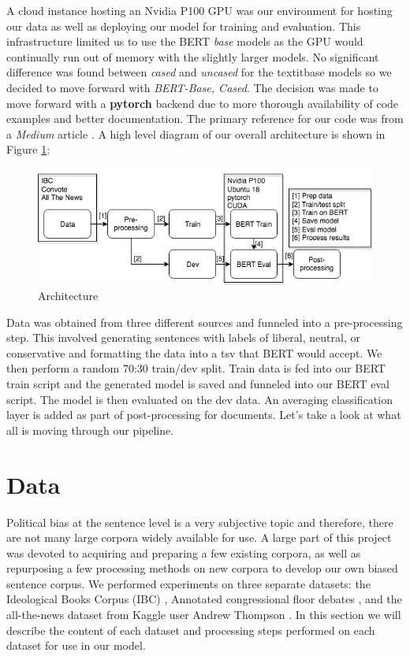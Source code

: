\documentclass[10pt,a4paper,onecolumn]{article}
\begin{document}
A cloud instance hosting an Nvidia P100 GPU was our environment for hosting our data as well as deploying our model for training and evaluation. This infrastructure limited us to use the BERT \textit{base} models as the GPU would continually run out of memory with the slightly larger models. No significant difference was found between \textit{cased} and \textit{uncased} for the textit{base} models so we decided to move forward with \textit{BERT-Base, Cased}. The decision was made to move forward with a \textbf{pytorch} backend due to more thorough availability of code examples and better documentation. The primary reference for our code was from a \textit{Medium} article \cite{usingbert}. A high level diagram of our overall architecture is shown in Figure \ref{fig:architecture}:
\begin{figure}[h]
	\begin{center}
		\includegraphics[width=0.8\linewidth]{architecture.png}
		\caption{Architecture}
		\label{fig:architecture}
	\end{center}
\end{figure}
Data was obtained from three different sources and funneled into a pre-processing step. This involved generating sentences with labels of liberal, neutral, or conservative and formatting the data into a tsv that BERT would accept. We then perform a random 70:30 train/dev split. Train data is fed into our BERT train script and the generated model is saved and funneled into our BERT eval script. The model is then evaluated on the dev data. An averaging classification layer is added as part of post-processing for documents. Let's take a look at what all is moving through our pipeline. 

\section{Data}
\label{sec:data}
Political bias at the sentence level is a very subjective topic and therefore, there are not many large corpora widely available for use. A large part of this project was devoted to acquiring and preparing a few existing corpora, as well as repurposing a few processing methods on new corpora to develop our own biased sentence corpus. We performed experiments on three separate datasets: the Ideological Books Corpus (IBC) \cite{iyyerRNN}, Annotated congressional floor debates \cite{convote}, and the all-the-news dataset from Kaggle user Andrew Thompson \cite{news}. In this section we will describe the content of each dataset and processing steps performed on each dataset for use in our model.
\end{document}
